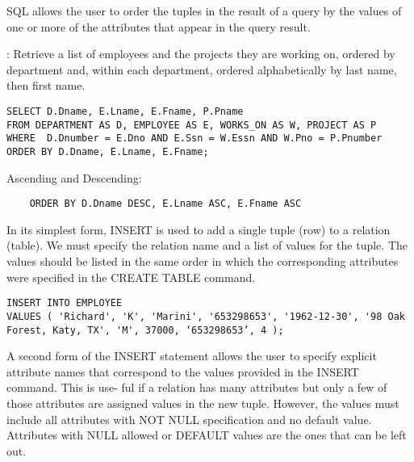     \par SQL allows the user to order the tuples in the result of a query by the values of one or more of the attributes that appear in the query result.
    \par {}: Retrieve a list of employees and the projects they are working on, ordered by department and, within each department, ordered alphabetically by last name, then first name.
      \begin{lstlisting}
SELECT D.Dname, E.Lname, E.Fname, P.Pname
FROM DEPARTMENT AS D, EMPLOYEE AS E, WORKS_ON AS W, PROJECT AS P
WHERE  D.Dnumber = E.Dno AND E.Ssn = W.Essn AND W.Pno = P.Pnumber
ORDER BY D.Dname, E.Lname, E.Fname;
      \end{lstlisting}
    \par Ascending and Descending:
       \begin{lstlisting}
    ORDER BY D.Dname DESC, E.Lname ASC, E.Fname ASC
      \end{lstlisting}


    \par In its simplest form, INSERT is used to add a single tuple (row) to a relation (table). We must specify the relation name and a list of values for the tuple. The values should be listed in the same order in which the corresponding attributes were specified in the CREATE TABLE command.

      \begin{lstlisting}
INSERT INTO EMPLOYEE
VALUES ( 'Richard', 'K', 'Marini', '653298653', '1962-12-30', '98 Oak Forest, Katy, TX', 'M', 37000, ‘653298653’, 4 );
      \end{lstlisting}

    \par A second form of the INSERT statement allows the user to specify explicit attribute
    names that correspond to the values provided in the INSERT command. This is use-
    ful if a relation has many attributes but only a few of those attributes are assigned
    values in the new tuple. However, the values must include all attributes with NOT
    NULL specification and no default value. Attributes with NULL allowed or DEFAULT
    values are the ones that can be left out.

